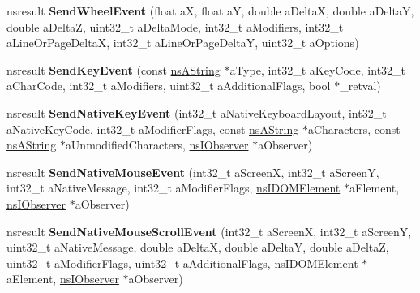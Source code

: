 \begin{DoxyCompactItemize}
\mbox{\label{interfacens_i_d_o_m_window_utils_ad419fd66efeba3f7e6a9587df77b0506}} 
nsresult {\bfseries Send\+Wheel\+Event} (float aX, float aY, double a\+DeltaX, double a\+DeltaY, double a\+DeltaZ, uint32\+\_\+t a\+Delta\+Mode, int32\+\_\+t a\+Modifiers, int32\+\_\+t a\+Line\+Or\+Page\+DeltaX, int32\+\_\+t a\+Line\+Or\+Page\+DeltaY, uint32\+\_\+t a\+Options)
\item 
\mbox{\label{interfacens_i_d_o_m_window_utils_a53ca608247e123cd76a671e8496b7811}} 
nsresult {\bfseries Send\+Key\+Event} (const \hyperlink{structns_string_container}{ns\+A\+String} $\ast$a\+Type, int32\+\_\+t a\+Key\+Code, int32\+\_\+t a\+Char\+Code, int32\+\_\+t a\+Modifiers, uint32\+\_\+t a\+Additional\+Flags, bool $\ast$\+\_\+retval)
\item 
\mbox{\label{interfacens_i_d_o_m_window_utils_a7660079c4d24ccb4ad5ca4bb64e96d50}} 
nsresult {\bfseries Send\+Native\+Key\+Event} (int32\+\_\+t a\+Native\+Keyboard\+Layout, int32\+\_\+t a\+Native\+Key\+Code, int32\+\_\+t a\+Modifier\+Flags, const \hyperlink{structns_string_container}{ns\+A\+String} $\ast$a\+Characters, const \hyperlink{structns_string_container}{ns\+A\+String} $\ast$a\+Unmodified\+Characters, \hyperlink{interfacens_i_supports}{ns\+I\+Observer} $\ast$a\+Observer)
\item 
\mbox{\label{interfacens_i_d_o_m_window_utils_ab2b2e16baf83b70779efaf620220b52d}} 
nsresult {\bfseries Send\+Native\+Mouse\+Event} (int32\+\_\+t a\+ScreenX, int32\+\_\+t a\+ScreenY, int32\+\_\+t a\+Native\+Message, int32\+\_\+t a\+Modifier\+Flags, \hyperlink{interfacens_i_d_o_m_element}{ns\+I\+D\+O\+M\+Element} $\ast$a\+Element, \hyperlink{interfacens_i_supports}{ns\+I\+Observer} $\ast$a\+Observer)
\item 
\mbox{\label{interfacens_i_d_o_m_window_utils_a98ffb33c28bc47993adbdcfc096a59b2}} 
nsresult {\bfseries Send\+Native\+Mouse\+Scroll\+Event} (int32\+\_\+t a\+ScreenX, int32\+\_\+t a\+ScreenY, uint32\+\_\+t a\+Native\+Message, double a\+DeltaX, double a\+DeltaY, double a\+DeltaZ, uint32\+\_\+t a\+Modifier\+Flags, uint32\+\_\+t a\+Additional\+Flags, \hyperlink{interfacens_i_d_o_m_element}{ns\+I\+D\+O\+M\+Element} $\ast$a\+Element, \hyperlink{interfacens_i_supports}{ns\+I\+Observer} $\ast$a\+Observer)

\end{DoxyCompactItemize}
